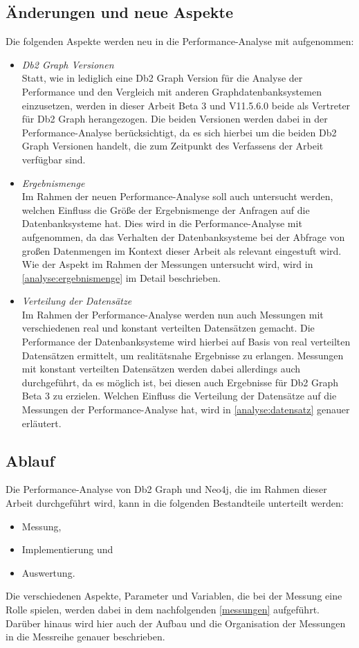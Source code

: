 \subsection{Änderungen und neue Aspekte}
Die folgenden Aspekte werden neu in die Performance-Analyse mit aufgenommen:
\begin{itemize}
    \item \textit{Db2 Graph Versionen}\\
    Statt, wie in \cite{sigmod_tian} lediglich eine Db2 Graph Version für die Analyse der Performance und den Vergleich mit anderen Graphdatenbanksystemen einzusetzen, werden in dieser Arbeit Beta 3 und V11.5.6.0 beide als Vertreter für Db2 Graph herangezogen. Die beiden Versionen werden dabei in der Performance-Analyse berücksichtigt, da es sich hierbei um die beiden Db2 Graph Versionen handelt, die zum Zeitpunkt des Verfassens der Arbeit verfügbar sind.
    \item \textit{Ergebnismenge}\\
    Im Rahmen der neuen Performance-Analyse soll auch untersucht werden, welchen Einfluss die Größe der Ergebnismenge der Anfragen auf die Datenbanksysteme hat. Dies wird in die Performance-Analyse mit aufgenommen, da das Verhalten der Datenbanksysteme bei der Abfrage von großen Datenmengen im Kontext dieser Arbeit als relevant eingestuft wird. Wie der Aspekt im Rahmen der Messungen untersucht wird, wird in \autoref{analyse:ergebnismenge} im Detail beschrieben.
    \item \textit{Verteilung der Datensätze}\\
    Im Rahmen der Performance-Analyse werden nun auch Messungen mit verschiedenen real und konstant verteilten Datensätzen gemacht. Die Performance der Datenbanksysteme wird hierbei auf Basis von real verteilten Datensätzen ermittelt, um realitätsnahe Ergebnisse zu erlangen. Messungen mit konstant verteilten Datensätzen werden dabei allerdings auch durchgeführt, da es möglich ist, bei diesen auch Ergebnisse für Db2 Graph Beta 3 zu erzielen. Welchen Einfluss die Verteilung der Datensätze auf die Messungen der Performance-Analyse hat, wird in \autoref{analyse:datensatz} genauer erläutert. 
\end{itemize}

\subsection{Ablauf}
Die Performance-Analyse von Db2 Graph und Neo4j, die im Rahmen dieser Arbeit durchgeführt wird, kann in die folgenden Bestandteile unterteilt werden: 
\begin{itemize}
    \item Messung,
    \item Implementierung und 
    \item Auswertung.
\end{itemize}
Die verschiedenen Aspekte, Parameter und Variablen, die bei der Messung eine Rolle spielen, werden dabei in dem nachfolgenden \autoref{messungen} aufgeführt. Darüber hinaus wird hier auch der Aufbau und die Organisation der Messungen in die Messreihe genauer beschrieben. 


